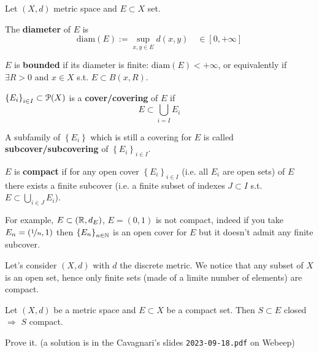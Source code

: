 Let $(X,d)$ metric space and $E\subset X$ set.

\begin{defn}
The \textbf{diameter} of $E$ is
\begin{equation*}
\text{diam}(E):=\sup_{x,y\in E} d(x,y)\quad\in[0,+\infty]
\end{equation*}
\end{defn}

\begin{defn}
$E$ is \textbf{bounded} if its diameter is finite: $\text{diam}(E)<+\infty$, or equivalently if $\exists R>0$ and $x\in X$ s.t. $E\subset B(x,R)$.
\end{defn}

\begin{defn}
$\left\{ E_i \right\}_{i\in I}\subset\EuScript{P}(X)$ is a \textbf{cover/covering} of $E$ if 
\begin{equation*}
E\subset\bigcup_{i=I} E_i
\end{equation*}

A subfamily of $\left\{ E_i \right\}$ which is still a covering for $E$ is called \textbf{subcover/subcovering} of $\left\{ E_i \right\}_{i\in I}$.
\end{defn}

\begin{defn}
$E$ is \textbf{compact} if for any open cover $\left\{ E_i \right\}_{i\in I}$ (i.e. all $E_i$ are open sets) of $E$ there exists a finite subcover (i.e. a finite subset of indexes $J\subset I$ s.t. $E\subset\bigcup_{i\in J}E_i$).
\end{defn}

For example, $E\subset(\mathbb{R},d_E)$, $E=(0,1)$ is not compact, indeed if you take $E_n=\left( \nicefrac{1}{n},1 \right)$ then $\left\{ E_n \right\}_{n\in \mathbb{N}}$ is an open cover for $E$ but it doesn't admit any finite subcover.

\begin{marker}
Let's consider $(X,d)$ with $d$ the discrete metric. We notice that any subset of $X$ is an open set, hence only finite sets (made of a limite number of elements) are compact.
\end{marker}

\begin{thm}
Let $(X,d)$ be a metric space and $E\subset X$ be a compact set. Then $S\subset E$ closed $\Longrightarrow$ $S$ compact.
\end{thm}

\begin{home}
Prove it.
\newline
\newline
\newline
\newline
\newline
\newline
\newline
\newline
(a solution is in the Cavagnari's slides \texttt{2023-09-18.pdf} on Webeep)
\end{home}

